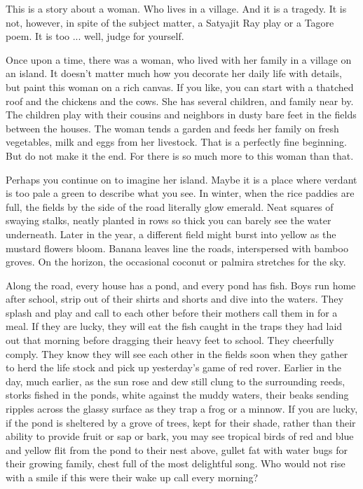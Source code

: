 \documentclass{amsart}
\begin{document}
This is a story about a woman. Who lives in a village. And it is a tragedy. It is not, however, in spite of the subject matter, a Satyajit Ray play or a Tagore poem. It is too ... well, judge for yourself.

Once upon a time, there was a woman, who lived with her family in a village on an island. It doesn't matter much how you decorate her daily life with details, but paint this woman on a rich canvas. If you like, you can start with a thatched roof and the chickens and the cows. She has several children, and family near by. The children play with their cousins and neighbors in dusty bare feet in the fields between the houses. The woman tends a garden and feeds her family on fresh vegetables, milk and eggs from her livestock. That is a perfectly fine beginning. But do not make it the end. For there is so much more to this woman than that.

Perhaps you continue on to imagine her island. Maybe it is a place where verdant is too pale a green to describe what you see. In winter, when the rice paddies are full, the fields by the side of the road literally glow emerald. Neat squares of swaying stalks, neatly planted in rows so thick you can barely see the water underneath. Later in the year, a different field might burst into yellow as the mustard flowers bloom. Banana leaves line the roads, interspersed with bamboo groves. On the horizon, the occasional coconut or palmira stretches for the sky. 

Along the road, every house has a pond, and every pond has fish. Boys run home after school, strip out of their shirts and shorts and dive into the waters. They splash and play and call to each other before their mothers call them in for a meal. If they are lucky, they will eat the fish caught in the traps they had laid out that morning before dragging their heavy feet to school. They cheerfully comply. They know they will see each other in the fields soon when they gather to herd the life stock and pick up yesterday's game of red rover. Earlier in the day, much earlier, as the sun rose and dew still clung to the surrounding reeds, storks fished in the ponds, white against the muddy waters, their beaks sending ripples across the glassy surface as they trap a frog or a minnow. If you are lucky, if the pond is sheltered by a grove of trees, kept for their shade, rather than their ability to provide fruit or sap or bark, you may see tropical birds of red and blue and yellow flit from the pond to their nest above, gullet fat with water bugs for their growing family, chest full of the most delightful song. Who would not rise with a smile if this were their wake up call every morning?
\end{document}
